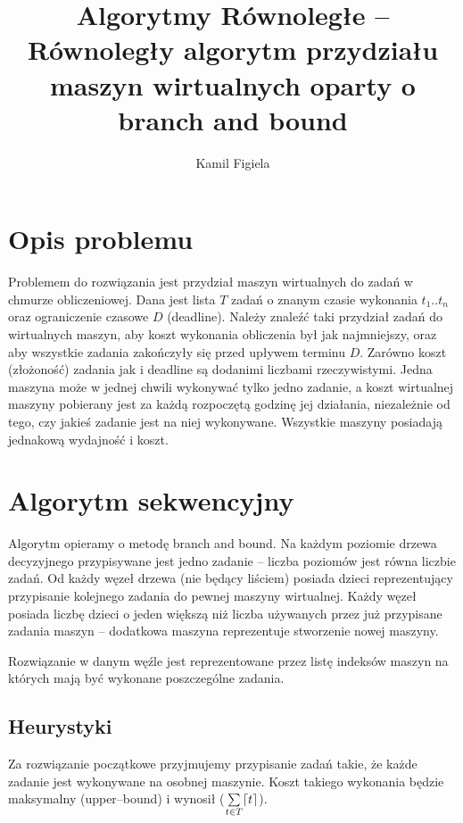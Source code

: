 \documentclass[a4paper]{article}
\title{Algorytmy Równoległe – Równoległy algorytm przydziału maszyn wirtualnych oparty o branch and bound}
\author{Kamil Figiela}
\DeclarePairedDelimiter{\ceil}{\lceil}{\rceil}
\begin{document}
\maketitle

\section{Opis problemu}

Problemem do rozwiązania jest przydział maszyn wirtualnych do zadań w chmurze obliczeniowej. Dana jest lista $T$ zadań o znanym czasie wykonania $t_1..t_n$ oraz ograniczenie czasowe $D$ (deadline). Należy znaleźć taki przydział zadań do wirtualnych maszyn, aby koszt wykonania obliczenia był jak najmniejszy, oraz aby wszystkie zadania zakończyły się przed upływem terminu $D$. Zarówno koszt (złożoność) zadania jak i deadline są dodanimi liczbami rzeczywistymi. Jedna maszyna może w jednej chwili wykonywać tylko jedno zadanie, a koszt wirtualnej maszyny pobierany jest za każdą rozpoczętą godzinę jej działania, niezależnie od tego, czy jakieś zadanie jest na niej wykonywane. Wszystkie maszyny posiadają jednakową wydajność i koszt.

\section{Algorytm sekwencyjny}

Algorytm opieramy o metodę branch and bound. Na każdym poziomie drzewa decyzyjnego przypisywane jest jedno zadanie – liczba poziomów jest równa liczbie zadań. Od każdy węzeł drzewa (nie będący liściem) posiada dzieci reprezentujący przypisanie kolejnego zadania do pewnej maszyny wirtualnej. Każdy węzeł posiada liczbę dzieci o jeden większą niż liczba używanych przez już przypisane zadania maszyn – dodatkowa maszyna reprezentuje stworzenie nowej maszyny.

Rozwiązanie w danym węźle jest reprezentowane przez listę indeksów maszyn na których mają być wykonane poszczególne zadania.

\subsection{Heurystyki}

Za rozwiązanie początkowe przyjmujemy przypisanie zadań takie, że każde zadanie jest wykonywane na osobnej maszynie. Koszt takiego wykonania będzie maksymalny (upper–bound) i wynosił ($\mathop\sum\limits_{t \in T} \ceil*{t}$).
\end{document}
